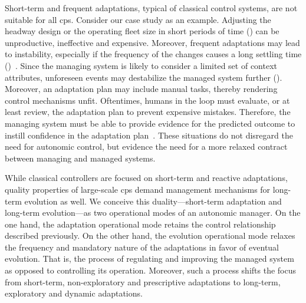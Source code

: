 Short-term and frequent adaptations, typical of classical control systems, are not suitable for all \gls{cps}. Consider our case study as an example. Adjusting the headway design or the operating fleet size in short periods of time () can be unproductive, ineffective and expensive. Moreover, frequent adaptations may lead to instability, especially if the frequency of the changes causes a long settling time ()~\cite{villegas-2011-framework}. Since the managing system is likely to consider a limited set of context attributes, unforeseen events may destabilize the managed system further (). Moreover, an adaptation plan may include manual tasks, thereby rendering control mechanisms unfit. Oftentimes, humans in the loop must evaluate, or at least review, the adaptation plan to prevent expensive mistakes. Therefore, the managing system must be able to provide evidence for the predicted outcome to instill confidence in the adaptation plan~\cite{baresi-2010-disappearing,andersson-2013-software,tavcar-2019-review}. These situations do not disregard the need for autonomic control, but evidence the need for a more relaxed contract between managing and managed systems.

While classical controllers are focused on short-term and reactive adaptations, quality properties of large-scale \gls{cps} demand management mechanisms for long-term evolution as well. We conceive this duality---short-term adaptation and long-term evolution---as two operational modes of an autonomic manager. On the one hand, the adaptation operational mode retains the control relationship described previously. On the other hand, the evolution operational mode relaxes the frequency and mandatory nature of the adaptations in favor of eventual evolution. That is, the process of regulating and improving the managed system as opposed to controlling its operation. Moreover, such a process shifts the focus from short-term, non-exploratory and prescriptive adaptations to long-term, exploratory and dynamic adaptations.

